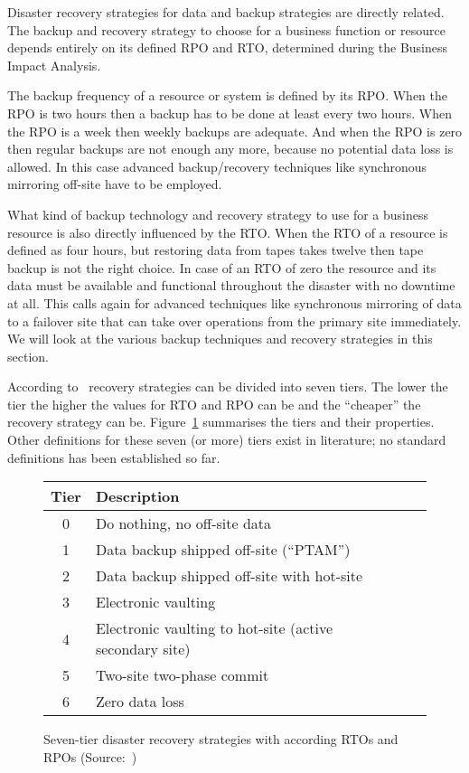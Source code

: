 \documentclass[a4paper,11pt,onecolumn]{scrartcl}
\begin{document}
Disaster recovery strategies for data and backup strategies are directly
related. The backup and recovery strategy to choose for a business
function or resource depends entirely on its defined RPO and RTO,
determined during the Business Impact Analysis.

The backup frequency of a resource or system is defined by its RPO. When
the RPO is two hours then a backup has to be done at least every two
hours. When the RPO is a week then weekly backups are adequate. And when
the RPO is zero then regular backups are not enough any more, because no
potential data loss is allowed. In this case advanced backup/recovery
techniques like synchronous mirroring off-site have to be employed.

What kind of backup technology and recovery strategy to use for a
business resource is also directly influenced by the RTO. When the RTO
of a resource is defined as four hours, but restoring data from tapes
takes twelve then tape backup is not the right choice. In case of an RTO
of zero the resource and its data must be available and functional
throughout the disaster with no downtime at all. This calls again for
advanced techniques like synchronous mirroring of data to a failover
site that can take over operations from the primary site immediately. We
will look at the various backup techniques and recovery strategies in
this section.

According to~\cite{brooks2002disaster} recovery strategies can be
divided into seven tiers. The lower the tier the higher the values for
RTO and RPO can be and the ``cheaper'' the recovery strategy can be.
Figure~\ref{fig:seventier} summarises the tiers and their properties.
Other definitions for these seven (or more) tiers exist in literature;
no standard definitions has been established so far.

\begin{figure}[t]
    \begin{center}
    \begin{tabular}{clll}
		\toprule
    	Tier & Description \\
        \midrule
        0    & Do nothing, no off-site data \\
    	1    & Data backup shipped off-site (``PTAM'')  \\
    	2    & Data backup shipped off-site with hot-site  \\
    	3    & Electronic vaulting  \\
    	4    & Electronic vaulting to hot-site (active secondary site) \\
    	5    & Two-site two-phase commit  \\
    	6    & Zero data loss  \\
		\bottomrule
    \end{tabular}
    \end{center}
    \caption{Seven-tier disaster recovery
    	strategies with according RTOs and RPOs
    	(Source:~\cite{wiboonratr2009optimal})}
    \label{fig:seventier}
\end{figure}
\end{document}
